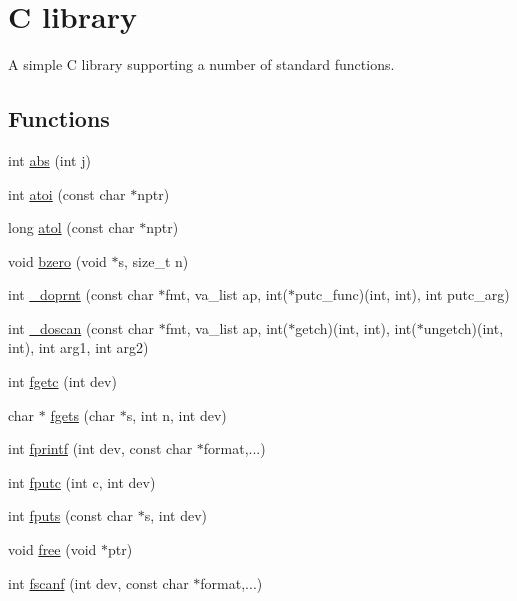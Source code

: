 \hypertarget{group__libxc}{\section{C library}
\label{group__libxc}
}


A simple C library supporting a number of standard functions.  


\subsection*{Functions}
\begin{DoxyCompactItemize}
\item 
int \hyperlink{group__libxc_gaeb20b44c8437544e571a3cb9bb2cc37d}{abs} (int j)
\item 
int \hyperlink{group__libxc_gad228deceea1bac4d9f171f647c265059}{atoi} (const char $\ast$nptr)
\item 
long \hyperlink{group__libxc_ga185551efd32d058ef290ebe2d144219f}{atol} (const char $\ast$nptr)
\item 
void \hyperlink{group__libxc_ga59505af7f1c47ff01fdb944801642033}{bzero} (void $\ast$s, size\-\_\-t n)
\item 
int \hyperlink{group__libxc_gaf48b30d4bbe6f24fac50996ad08dee81}{\-\_\-doprnt} (const char $\ast$fmt, va\-\_\-list ap, int($\ast$putc\-\_\-func)(int, int), int putc\-\_\-arg)
\item 
int \hyperlink{group__libxc_ga166404d618b580eb27442b03d55004fd}{\-\_\-doscan} (const char $\ast$fmt, va\-\_\-list ap, int($\ast$getch)(int, int), int($\ast$ungetch)(int, int), int arg1, int arg2)
\item 
int \hyperlink{group__libxc_ga331dd7c56def5258f0385d1e5f9220c1}{fgetc} (int dev)
\item 
char $\ast$ \hyperlink{group__libxc_ga573c8ad59f73c997adb58ea83a5a879a}{fgets} (char $\ast$s, int n, int dev)
\item 
int \hyperlink{group__libxc_ga4112ec293c0482854c66caaa708457c2}{fprintf} (int dev, const char $\ast$format,...)
\item 
int \hyperlink{group__libxc_ga32f19bdc96eb7c1eda177e01344f8c74}{fputc} (int c, int dev)
\item 
int \hyperlink{group__libxc_ga52df17ca21d792b6abb1559a77feaa13}{fputs} (const char $\ast$s, int dev)
\item 
void \hyperlink{group__libxc_gafbedc913aa4651b3c3b4b3aecd9b4711}{free} (void $\ast$ptr)
\item 
int \hyperlink{group__libxc_gaf9412bab60c15683f2cbf5397970bf38}{fscanf} (int dev, const char $\ast$format,...)

\end{DoxyCompactItemize}
